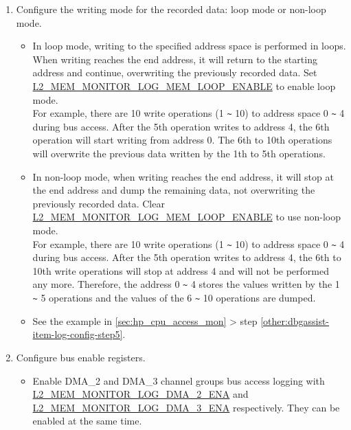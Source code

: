 \documentclass[main\_\_EN.tex]{subfiles}
\begin{document}
\begin{enumerate}
\item Configure the writing mode for the recorded data: loop mode or non-loop mode.
        \begin{itemize}
            \item In loop mode, writing to the specified address space is performed in loops. When writing reaches the end address, it will return to the starting address and continue, overwriting the previously recorded data. Set \hyperref[fielddesc:L2MEMMONITORLOGMEMLOOPENABLE]{L2\_MEM\_MONITOR\_LOG\_MEM\_LOOP\_ENABLE} to enable loop mode.\\
            For example, there are 10 write operations (1 \verb+~+ 10) to address space 0 \verb+~+ 4 during bus access. After the 5th operation writes to address 4, the 6th operation will start writing from address 0. The 6th to 10th operations will overwrite the previous data written by the 1th to 5th operations.
            \item In non-loop mode, when writing reaches the end address, it will stop at the end address and dump the remaining data, not overwriting the previously recorded data. Clear \hyperref[fielddesc:L2MEMMONITORLOGMEMLOOPENABLE]{L2\_MEM\_MONITOR\_LOG\_MEM\_LOOP\_ENABLE} to use non-loop mode.\\
            For example, there are 10 write operations (1 \verb+~+ 10) to address space 0 \verb+~+ 4 during bus access. After the 5th operation writes to address 4, the 6th to 10th write operations will stop at address 4 and will not be performed any more. Therefore, the address 0 \verb+~+ 4 stores the values written by the 1 \verb+~+ 5 operations and the values of the 6 \verb+~+ 10 operations are dumped.
            \item See the example in \ref{sec:hp_cpu_access_mon} > step \ref{other:dbgassist-item-log-config-step5}.
        \end{itemize}

\item Configure bus enable registers.
        \begin{itemize}
            \item Enable DMA\_2 and DMA\_3 channel groups bus access logging with \hyperref[fielddesc:L2MEMMONITORLOGDMA2ENA]{L2\_MEM\_MONITOR\_LOG\_DMA\_2\_ENA} and \hyperref[fielddesc:L2MEMMONITORLOGDMA3ENA]{L2\_MEM\_MONITOR\_LOG\_DMA\_3\_ENA} respectively. They can be enabled at the same time.
        \end{itemize}

\end{enumerate}
\end{document}
